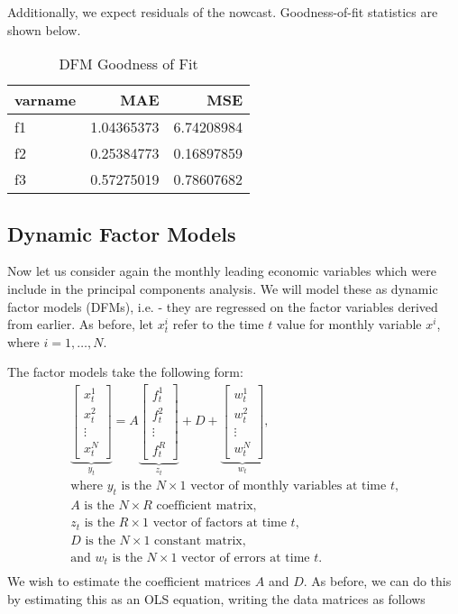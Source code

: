 \documentclass[11pt, letterpaper]{article}\usepackage[]{graphicx}\usepackage[]{color}
\begin{document}
Additionally, we expect residuals of the nowcast. Goodness-of-fit statistics are shown below.
\begin{table}[H]
\centering
\begingroup\footnotesize
\begin{tabular}{lrr}
  \hline
varname & MAE & MSE \\ 
  \hline
f1 & 1.04365373 & 6.74208984 \\ 
  f2 & 0.25384773 & 0.16897859 \\ 
  f3 & 0.57275019 & 0.78607682 \\ 
   \hline
\end{tabular}
\endgroup
\caption{DFM Goodness of Fit} 
\end{table}




\subsection{Dynamic Factor Models}
Now let us consider again the monthly leading economic variables which were include in the principal components analysis. We will model these as dynamic factor models (DFMs), i.e. - they are regressed on the factor variables derived from earlier. As before, let $x^i_t$ refer to the time $t$ value for monthly variable $x^i$, where $i = 1, \dots, N$.

The factor models take the following form:
\begin{align*}
\underbrace{\begin{bmatrix}
	x^1_t\\
	x^2_t\\
	\vdots \\
	x^N_t
\end{bmatrix}}_{y_t}
=
A
\underbrace{\begin{bmatrix}
	f^1_{t}\\
	f^2_{t}\\
	\vdots \\
	f^R_{t}
\end{bmatrix}}_{z_t}
+
D 
+
\underbrace{\begin{bmatrix}
	w^1_t\\
	w^2_t\\
	\vdots\\
	w^N_t
\end{bmatrix}}_{w_t},\\
\text{where $y_t$ is the $N \times 1$ vector of monthly variables at time $t$,}\\
\text{$A$ is the $N \times R$ coefficient matrix,}\\
\text{$z_t$ is the $R \times 1$ vector of factors at time $t$,}\\
\text{$D$ is the $N \times 1$ constant matrix,}\\
\text{and $w_t$ is the $N \times 1$ vector of errors at time $t$.}\\
\end{align*}
We wish to estimate the coefficient matrices $A$ and $D$. As before, we can do this by estimating this as an OLS equation, writing the data matrices as follows
\end{document}

